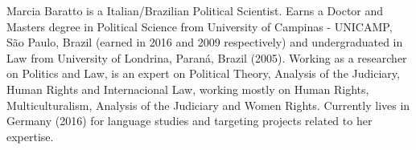 
\begin{cvparagraph}

Marcia Baratto is a Italian/Brazilian Political Scientist. Earns a Doctor and Masters degree in Political Science from University of Campinas - UNICAMP, São Paulo, Brazil (earned in 2016 and 2009 respectively) and undergraduated in Law from University of Londrina, Paraná, Brazil (2005). Working as a researcher on Politics and Law, is an expert on Political Theory, Analysis of the Judiciary, Human Rights and Internacional Law, working mostly on Human Rights, Multiculturalism, Analysis of the Judiciary and Women Rights. Currently lives in Germany (2016) for language studies and targeting projects related to her expertise.

\end{cvparagraph}
